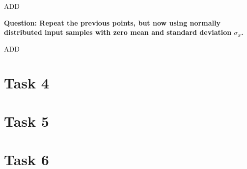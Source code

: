 \documentclass[11pt,a4paper]{article}
\begin{document}
ADD

\vspace{1cm}
\textbf{Question: Repeat the previous points, but now using normally distributed input samples with zero mean and standard deviation $\sigma_x$.
}
\vspace{0.5cm}

ADD

\vspace{0.5cm}
\section{Task 4}


\vspace{0.5cm}
\section{Task 5}


\vspace{0.5cm}
\section{Task 6}

\end{document}
